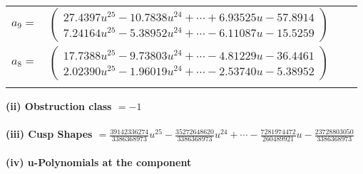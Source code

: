 \documentclass[1p]{elsarticle_modified}
\theoremstyle{definition}
\begin{document}
\begin{tabular}{m{7pt} m{180pt} m{7pt} m{180pt} }
\flushright $a_{9}=$&$\begin{pmatrix}27.4397 u^{25}-10.7838 u^{24}+\cdots+6.93525 u-57.8914\\7.24164 u^{25}-5.38952 u^{24}+\cdots-6.11087 u-15.5259\end{pmatrix}$ \\
\flushright $a_{8}=$&$\begin{pmatrix}17.7388 u^{25}-9.73803 u^{24}+\cdots-4.81229 u-36.4461\\2.02390 u^{25}-1.96019 u^{24}+\cdots-2.53740 u-5.38952\end{pmatrix}$\\&\end{tabular}
\flushleft \textbf{(ii) Obstruction class $= -1$}\\~\\
\flushleft \textbf{(iii) Cusp Shapes $= \frac{39142336274}{3386368973} u^{25}-\frac{35272648620}{3386368973} u^{24}+\cdots-\frac{7281974472}{260489921} u-\frac{23728803050}{3386368973}$}\\~\\
\newpage\renewcommand{\arraystretch}{1}
\flushleft \textbf{(iv) u-Polynomials at the component}\newline \\
\end{document}
